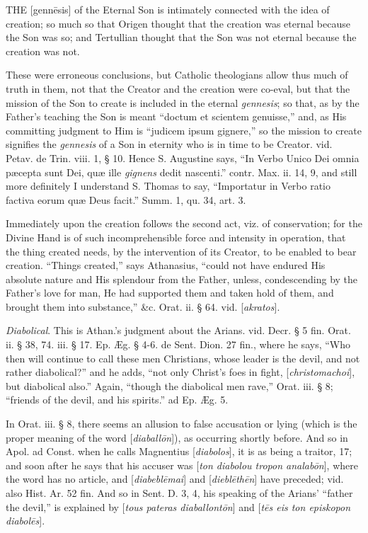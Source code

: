 \xsection{[Demiourgos]}

THE
[genn\={e}sis]
of the Eternal Son is intimately connected with the idea of creation;
so much so that Origen thought that the creation was eternal because
the Son was so; and Tertullian thought that the Son was not eternal
because the creation was not.

These were erroneous conclusions, but Catholic
theologians allow thus much of truth in them, not that the Creator and
the creation were co-eval, but that the mission of the Son to create
is included in the eternal \emph{gennesis}; so that, as by the
Father’s teaching the Son is meant “doctum et scientem genuisse,”
and, as His committing judgment to Him is “judicem ipsum gignere,”
so the mission to create signifies the \emph{gennesis} of a Son in
eternity who is in time to be Creator. vid. Petav. de Trin. viii. 1,
§ 10. Hence S. Augustine says, “In Verbo Unico Dei omnia pæcepta
sunt Dei, quæ ille \emph{gignens} dedit nascenti.” contr. Max. ii.
14, 9, and still more definitely I understand S. Thomas to say,
“Importatur in Verbo ratio factiva eorum quæ Deus facit.” Summ.
1, qu. 34, art. 3.

Immediately upon the creation follows the second
act, viz. of conservation; for the Divine Hand is of such
incomprehensible force and intensity in operation, that the thing
created needs, by the intervention of its Creator, to be enabled to
bear creation. “Things created,” says Athanasius, “could
not have endured His absolute nature and His splendour from the
Father, unless, condescending by the Father’s love for man, He had
supported them and taken hold of them, and brought them into
substance,” \&c. Orat. ii. § 64. vid. [\emph{akratos}].

\xsection{[Diabolikos]}

\emph{Diabolical}. This is Athan.’s judgment
about the Arians. vid. Decr. § 5 fin. Orat. ii. § 38, 74. iii. §
17. Ep. Æg. § 4-6. de Sent. Dion. 27 fin., where he says, “Who
then will continue to call these men Christians, whose leader is the
devil, and not rather diabolical?” and he adds, “not only
Christ’s foes in fight, [\emph{christomachoi}], but diabolical
also.” Again, “though the diabolical men rave,” Orat. iii. § 8;
“friends of the devil, and his spirits.” ad Ep. Æg. 5.

In Orat. iii. § 8, there seems an allusion to
false accusation or lying (which is the proper meaning of the word [\emph{diaball\={o}n}]),
as occurring shortly before. And so in Apol. ad Const. when he calls
Magnentius [\emph{diabolos}], it is as being a traitor, 17; and soon
after he says that his accuser was [\emph{ton diabolou tropon analab\={o}n}],
where the word has no article, and [\emph{diabebl\={e}mai}] and [\emph{diebl\={e}th\={e}n}]
have preceded; vid. also Hist. Ar. 52 fin. And so in Sent. D. 3, 4,
his speaking of the Arians’ “father the devil,” is explained by
[\emph{tous pateras diaballont\={o}n}] and [\emph{t\={e}s eis ton
episkopon diabol\={e}s}].

